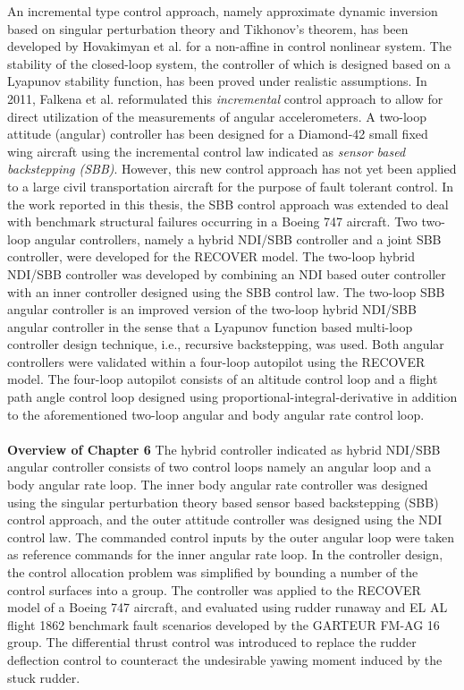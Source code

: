 An incremental type control approach, namely approximate dynamic inversion based on singular perturbation theory and Tikhonov's theorem, has been developed by Hovakimyan et al. \cite{naira2007} for a non-affine in control nonlinear system. The stability of the closed-loop system, the controller of which is designed based on a Lyapunov stability function, has been proved under realistic assumptions. In 2011, Falkena et al. \cite{wouter2011} reformulated this \textit{incremental} control approach to allow for direct utilization of the measurements of angular accelerometers. A two-loop attitude (angular) controller has been designed for a Diamond-42 small fixed wing aircraft using the incremental control law indicated as \textit{sensor based backstepping (\ac{SBB})}. However, this new control approach has not yet been applied to a large civil transportation aircraft for the purpose of fault tolerant control. In the work reported in this thesis, the SBB control approach was extended to deal with benchmark structural failures occurring in a Boeing 747 aircraft.
Two two-loop angular controllers, namely a hybrid NDI/SBB controller and a joint SBB controller, were developed for the RECOVER model. The two-loop hybrid NDI/SBB controller was developed by combining an NDI based outer controller with an inner controller designed using the SBB control law. The two-loop SBB angular controller is an improved version of the two-loop hybrid NDI/SBB angular controller in the sense that a Lyapunov function based multi-loop controller design technique, i.e., recursive backstepping, was used.
Both angular controllers were validated within a four-loop autopilot using the RECOVER model. The four-loop autopilot consists of an altitude control loop and a flight path angle control loop designed using proportional-integral-derivative in addition to the aforementioned two-loop angular and body angular rate control loop. \\
\\
\noindent \textbf{Overview of Chapter 6} The hybrid controller indicated as hybrid NDI/SBB angular controller consists of two control loops namely an angular loop and a body angular rate loop. The inner body angular rate controller was designed using the singular perturbation theory based sensor based backstepping (\ac{SBB}) control approach, and the outer attitude controller was designed using the \ac{NDI} control law. The commanded control inputs by the outer angular loop were taken as reference commands for the inner angular rate loop.
In the controller design, the control allocation problem was simplified by bounding a number of the control surfaces into a group. The controller was applied to the RECOVER model of a Boeing 747 aircraft, and evaluated using rudder runaway and EL AL flight 1862 benchmark fault scenarios developed by the GARTEUR FM-AG 16 group. The differential thrust control was introduced to replace the rudder deflection control to counteract the undesirable yawing moment induced by the stuck rudder.\\

